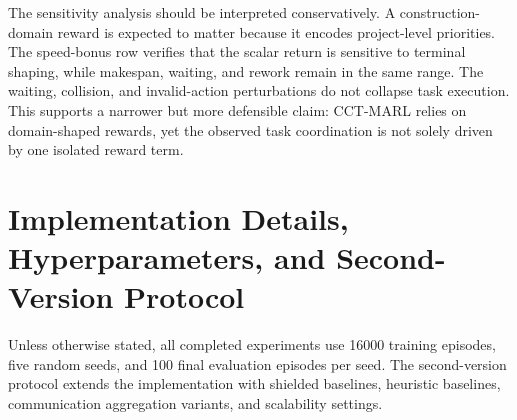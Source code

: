 \documentclass[preprint,12pt]{elsarticle}
\begin{document}
\begin{table}[htbp]
\centering
\caption{Completed reward-sensitivity results used for attribution analysis. Collision is zero under shielded execution in the revised runs.}
\label{tab:reward_sensitivity_appendix}
\end{table}


The sensitivity analysis should be interpreted conservatively. A construction-domain reward is expected to matter because it encodes project-level priorities. The speed-bonus row verifies that the scalar return is sensitive to terminal shaping, while makespan, waiting, and rework remain in the same range. The waiting, collision, and invalid-action perturbations do not collapse task execution. This supports a narrower but more defensible claim: CCT-MARL relies on domain-shaped rewards, yet the observed task coordination is not solely driven by one isolated reward term.

\section{Implementation Details, Hyperparameters, and Second-Version Protocol}
\label{app:implementation}

Unless otherwise stated, all completed experiments use 16000 training episodes, five random seeds, and 100 final evaluation episodes per seed. The second-version protocol extends the implementation with shielded baselines, heuristic baselines, communication aggregation variants, and scalability settings.
\end{document}
